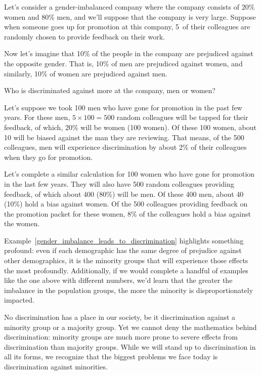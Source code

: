 \begin{examplewrap}
\begin{nexample}{Let's consider a gender-imbalanced
    company where the company consists of 20\% women
    and 80\% men, and we'll suppose that the
    company is very large.\footnotemark
    Suppose when someone goes up for promotion at this
    company, 5~of their colleagues are randomly chosen
    to provide feedback on their work.

    Now let's imagine that 10\% of the people in the
    company are prejudiced against the opposite gender.
    That is, 10\% of men are prejudiced against women,
    and similarly, 10\% of women are prejudiced against men.
    
    Who is discriminated against more at the company,
    men or women?}
  \label{gender_imbalance_leads_to_discrimination}%
  Let's suppose we took 100 men who have gone for promotion
  in the past few years.
  For these men, $5 \times 100 = 500$ random colleagues
  will be tapped for their feedback, of which,
  20\% will be women (100 women).
  Of these 100 women, about 10 will be biased against
  the man they are reviewing.
  That means, of the 500 colleagues, men will experience
  discrimination by about 2\% of their colleagues when
  they go for promotion.

  Let's complete a similar calculation for 100 women
  who have gone for promotion in the last few years.
  They will also have 500 random colleagues providing
  feedback, of which about 400 (80\%) will be men.
  Of these 400 men, about 40 (10\%) hold a bias against
  women.
  Of the 500 colleagues providing feedback on the
  promotion packet for these women, 8\% of the
  colleagues hold a bias against the women.
\end{nexample}
\end{examplewrap}

Example~\ref{gender_imbalance_leads_to_discrimination}
highlights something profound:
even if each demographic has the same degree of prejudice
against other demographics, it is the minority groups
that will experience those effects the most profoundly.
Additionally, if we would complete a handful of examples
like the one above with different numbers,
we'd learn that the greater the imbalance
in the population groups, the more the minority
is disproportionately impacted.

No discrimination has a place in our society,
be it discrimination against a minority group
or a majority group.
Yet we cannot deny the mathematics behind
discrimination: minority groups are much more
prone to severe effects from discrimination
than majority groups.
While we will stand up to discrimination in all
its forms, we recognize that the biggest problems
we face today is discrimination against minorities.


